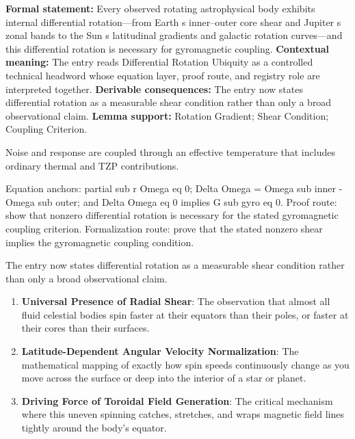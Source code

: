 \begingroup\footnotesize\setlength{\emergencystretch}{3em}\sloppy
\textbf{Formal statement:} Every observed rotating astrophysical body exhibits internal differential rotation---from Earth s inner--outer core shear and Jupiter s zonal bands to the Sun s latitudinal gradients and galactic rotation curves---and this differential rotation is necessary for gyromagnetic coupling. \textbf{Contextual meaning:} The entry reads Differential Rotation Ubiquity as a controlled technical headword whose equation layer, proof route, and registry role are interpreted together. \textbf{Derivable consequences:} The entry now states differential rotation as a measurable shear condition rather than only a broad observational claim. \textbf{Lemma support:} Rotation Gradient; Shear Condition; Coupling Criterion.\par
\endgroup

Noise and response are coupled through an effective temperature that includes ordinary thermal and TZP contributions.

Equation anchors: partial sub r Omega eq 0; Delta Omega = Omega sub inner - Omega sub outer; and Delta Omega eq 0 implies G sub gyro eq 0. Proof route: show that nonzero differential rotation is necessary for the stated gyromagnetic coupling criterion. Formalization route: prove that the stated nonzero shear implies the gyromagnetic coupling condition.

The entry now states differential rotation as a measurable shear condition rather than only a broad observational claim.
\endgroup

\begin{enumerate}[leftmargin=1.6em,itemsep=6pt,topsep=4pt]
\item \textbf{Universal Presence of Radial Shear}: The observation that almost all fluid celestial bodies spin faster at their equators than their poles, or faster at their cores than their surfaces.
\item \textbf{Latitude-Dependent Angular Velocity Normalization}: The mathematical mapping of exactly how spin speeds continuously change as you move across the surface or deep into the interior of a star or planet.
\item \textbf{Driving Force of Toroidal Field Generation}: The critical mechanism where this uneven spinning catches, stretches, and wraps magnetic field lines tightly around the body's equator.
\end{enumerate}

